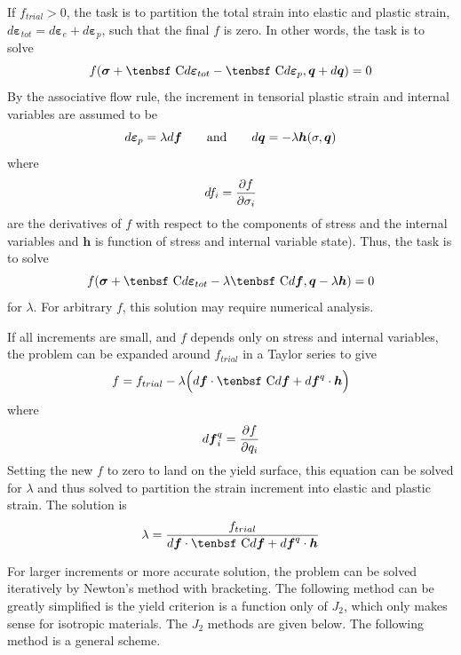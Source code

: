 \documentclass[11pt]{book}
\renewcommand{\vec}[1]{\boldsymbol{#1}}
\def\C{\hbox{\tenbsf C}}
\def\del{d \vec{\varepsilon}_{e}}
\def\dpl{d \vec{\varepsilon}_{p}}
\def\deff{d \vec{\varepsilon}_{tot}}
\def\df{d \vec{f}}
\def\dfq{d \vec{f}^q}
\def\dq{d\vec q}
\begin{document}
If $f_{trial}>0$, the task is to partition the total strain into elastic and plastic strain, $\deff=\del+\dpl$, such that the final $f$ is zero. In other words, the task is to solve
\begin{equation}
     f(\vec\sigma + \C \deff  - \C\dpl,\vec q + \dq) = 0
\end{equation}
By the associative flow rule, the increment in tensorial plastic strain and internal variables are assumed to be 
\begin{equation}
      \dpl = \lambda\df   \qquad {\rm and}\qquad \dq = -\lambda \vec h(\sigma,\vec q)
\end{equation}
where
\begin{equation}
      df_i = {\partial f\over \partial\sigma_i}   
\end{equation}
are the derivatives of $f$ with respect to the components of stress and the internal variables and $\vec h$ is function of stress and internal variable state). Thus, the task is to solve
\begin{equation}
     f(\vec\sigma + \C \deff - \lambda\C\df,\vec q -\lambda \vec h) = 0
\end{equation}
for $\lambda$. For arbitrary $f$, this solution may require numerical analysis.

If all increments are small, and $f$ depends only on stress and internal variables, the problem can be expanded around $f_{trial}$ in a Taylor series to give
\begin{equation}
    f  = f_{trial} - \lambda\Bigl( \df \cdot \C \df + \dfq \cdot \vec h \Bigr)
\end{equation}
where
\begin{equation}
\dfq_i = {\partial f\over \partial q_i}
\end{equation}
Setting the new $f$ to zero to land on the yield surface, this equation can be solved for $\lambda$ and thus solved to partition the strain increment into elastic and plastic strain. The solution is
\begin{equation}
        \lambda = { f_{trial}   \over  \df\cdot \C\df + \dfq \cdot \vec h }     \label{lambdaInitial}
\end{equation}

For larger increments or more accurate solution, the problem can be solved iteratively by Newton's method with bracketing. The following method can be greatly simplified is the yield criterion is a function only of $J_2$, which only makes sense for isotropic materials. The $J_2$ methods are given below. The following method is a general scheme.
\end{document}
